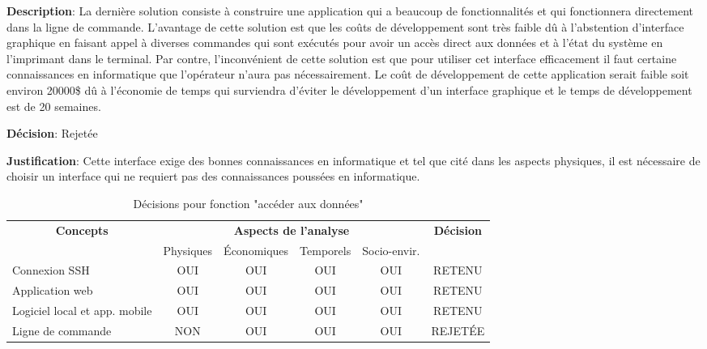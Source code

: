\textbf{Description}:
La dernière solution consiste à construire une application qui a beaucoup de fonctionnalités et qui fonctionnera directement dans la ligne de commande. L’avantage de cette solution est que les coûts de développement sont très faible dû à l’abstention d’interface graphique en faisant appel à diverses commandes qui sont exécutés pour avoir un accès direct aux données et à l’état du système en l’imprimant dans le terminal. Par contre, l’inconvénient de cette solution est que pour utiliser cet interface efficacement il faut certaine connaissances en informatique que l’opérateur n’aura pas nécessairement. Le coût de développement de cette application serait faible soit environ 20000\$ dû à l’économie de temps qui surviendra d’éviter le développement d’un interface graphique et le temps de développement est de 20 semaines.

\textbf{Décision}: Rejetée

\textbf{Justification}: Cette interface exige des bonnes connaissances en informatique et tel que cité dans les aspects physiques, il est nécessaire de choisir un interface qui ne requiert pas des connaissances poussées en informatique.

\begin{table}[!htbp]
	\begin{tabular}{|l|c|c|c|c|c|}
		\hline
		\multicolumn{1}{|c|}{\multirow{2}{*}{\textbf{Concepts}}} & \multicolumn{4}{c|}{\textbf{Aspects de l'analyse}} & \multirow{2}{*}{\textbf{Décision}} \\ \cline{2-5}
		\multicolumn{1}{|c|}{}                                   & Physiques & Économiques & Temporels & Socio-envir. &                                    \\ \hline
		Connexion SSH                                                  & OUI       & OUI         & OUI       & OUI          & RETENU                             \\ \hline
		Application web                                                 & OUI       & OUI         & OUI       & OUI          & RETENU                             \\ \hline
		Logiciel local et app. mobile                                                & OUI       & OUI         & OUI       & OUI          & RETENU                             \\ \hline
		Ligne de commande                                                 & NON       & OUI         & OUI       & OUI          & REJETÉE	        \\ \hline
	\end{tabular}
	\caption{Décisions pour fonction "accéder aux données"}
	\label{tab:fct_acceder}
\end{table}
